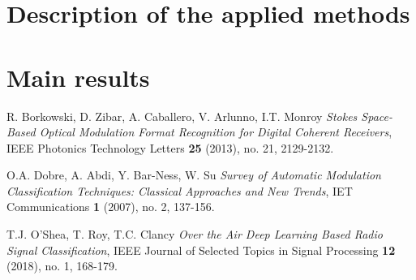 \documentclass[12pt]{article}
\theoremstyle{plain}
\theoremstyle{definition}
\theoremstyle{remark}
\begin{document}
	\section{Description of the applied methods}
	
	\section{Main results}
	
	\begin{thebibliography}{10}
		
		R. Borkowski, D. Zibar, A. Caballero, V. Arlunno, I.T. Monroy \emph{Stokes Space-Based Optical Modulation Format Recognition for Digital Coherent Receivers}, IEEE Photonics Technology Letters {\bf 25} (2013), no. 21, 2129-2132.
		
		O.A. Dobre, A. Abdi, Y. Bar-Ness, W. Su \emph{Survey of Automatic Modulation Classification Techniques: Classical Approaches and New Trends}, IET Communications {\bf 1} (2007), no. 2, 137-156.
		
		T.J. O'Shea, T. Roy, T.C. Clancy \emph{Over the Air Deep Learning Based Radio Signal Classification}, IEEE Journal of Selected Topics in Signal Processing {\bf 12} (2018), no. 1, 168-179.
		
	\end{thebibliography}
	
	
	
\end{document}
